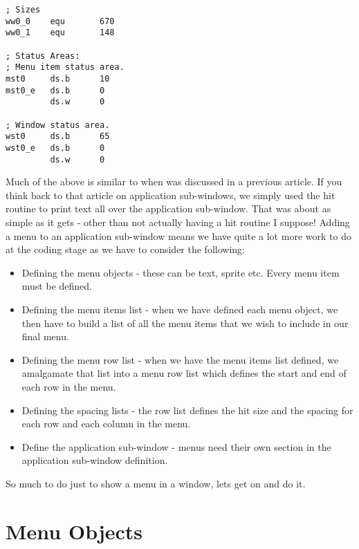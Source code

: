 \begin{lstlisting}[firstnumber=1,caption={AppMenuTest1Win\_asm}]
; Sizes
ww0_0    equ       670
ww0_1    equ       148

; Status Areas:
; Menu item status area.
mst0     ds.b      10
mst0_e   ds.b      0
         ds.w      0

; Window status area.
wst0     ds.b      65
wst0_e   ds.b      0
         ds.w      0
\end{lstlisting}

Much of the above is similar to when was discussed in a previous
    article. If you think back to that article on application sub-{}windows, we
    simply used the hit routine to print text all over the application
    sub-{}window. That was about as simple as it gets -{} other than not actually
    having a hit routine I suppose! Adding a menu to an application
    sub-{}window means we have quite a lot more work to do at the coding stage
    as we have to consider the following:
\begin{itemize}[itemsep=0pt]

\item{}Defining the menu objects -{} these can be text, sprite etc. Every
        menu item must be defined.


\item{}Defining the menu items list -{} when we have defined each menu
        object, we then have to build a list of all the menu items that we
        wish to include in our final menu.


\item{}Defining the menu row list -{} when we have the menu items list
        defined, we amalgamate that list into a menu row list which defines
        the start and end of each row in the menu.


\item{}Defining the spacing lists -{} the row list defines the hit size
        and the spacing for each row and each column in the menu.


\item{}Define the application sub-{}window -{} menus need their own section
        in the application sub-{}window definition.

\end{itemize}

So much to do just to show a menu in a window, lets get on and do
    it.

\section{Menu Objects}
\label{ch29-app-menu-objects}%

